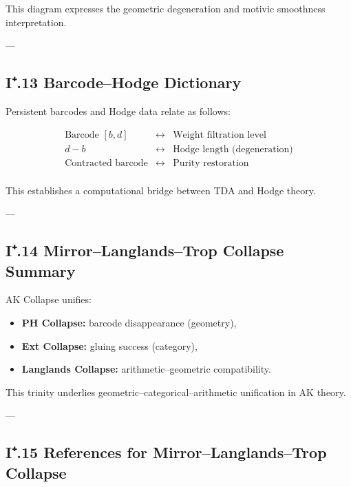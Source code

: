 \documentclass[11pt]{article}
\begin{document}
This diagram expresses the geometric degeneration and motivic smoothness interpretation.

---

\subsection*{I⁺.13 Barcode–Hodge Dictionary}

Persistent barcodes and Hodge data relate as follows:

\[
\begin{array}{ccc}
\text{Barcode } [b,d] & \leftrightarrow & \text{Weight filtration level} \\
d - b & \leftrightarrow & \text{Hodge length (degeneration)} \\
\text{Contracted barcode} & \leftrightarrow & \text{Purity restoration} \\
\end{array}
\]

This establishes a computational bridge between TDA and Hodge theory.

---

\subsection*{I⁺.14 Mirror–Langlands–Trop Collapse Summary}

AK Collapse unifies:

\begin{itemize}
  \item \textbf{PH Collapse:} barcode disappearance (geometry),
  \item \textbf{Ext Collapse:} gluing success (category),
  \item \textbf{Langlands Collapse:} arithmetic–geometric compatibility.
\end{itemize}

This trinity underlies geometric–categorical–arithmetic unification in AK theory.

---

\subsection*{I⁺.15 References for Mirror–Langlands–Trop Collapse}
\end{document}
